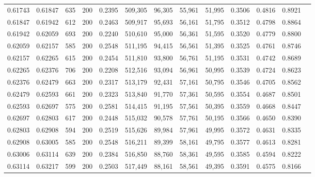 \begin{tabular}{rrrrrrrrrrrrr}
0.61743 & 0.61847 &    635 & 200 &                                     0.2395 & 509,305 &  96,305 &  55,961 &  51,995 & 0.3506 & 0.4816 & 0.8921 \\
0.61847 & 0.61942 &    612 & 200 &                                     0.2463 & 509,917 &  95,693 &  56,161 &  51,795 & 0.3512 & 0.4798 & 0.8864 \\
0.61942 & 0.62059 &    693 & 200 &                                     0.2240 & 510,610 &  95,000 &  56,361 &  51,595 & 0.3520 & 0.4779 & 0.8800 \\
0.62059 & 0.62157 &    585 & 200 &                                     0.2548 & 511,195 &  94,415 &  56,561 &  51,395 & 0.3525 & 0.4761 & 0.8746 \\
0.62157 & 0.62265 &    615 & 200 &                                     0.2454 & 511,810 &  93,800 &  56,761 &  51,195 & 0.3531 & 0.4742 & 0.8689 \\
0.62265 & 0.62376 &    706 & 200 &                                     0.2208 & 512,516 &  93,094 &  56,961 &  50,995 & 0.3539 & 0.4724 & 0.8623 \\
0.62376 & 0.62479 &    663 & 200 &                                     0.2317 & 513,179 &  92,431 &  57,161 &  50,795 & 0.3546 & 0.4705 & 0.8562 \\
0.62479 & 0.62593 &    661 & 200 &                                     0.2323 & 513,840 &  91,770 &  57,361 &  50,595 & 0.3554 & 0.4687 & 0.8501 \\
0.62593 & 0.62697 &    575 & 200 &                                     0.2581 & 514,415 &  91,195 &  57,561 &  50,395 & 0.3559 & 0.4668 & 0.8447 \\
0.62697 & 0.62803 &    617 & 200 &                                     0.2448 & 515,032 &  90,578 &  57,761 &  50,195 & 0.3566 & 0.4650 & 0.8390 \\
0.62803 & 0.62908 &    594 & 200 &                                     0.2519 & 515,626 &  89,984 &  57,961 &  49,995 & 0.3572 & 0.4631 & 0.8335 \\
0.62908 & 0.63005 &    585 & 200 &                                     0.2548 & 516,211 &  89,399 &  58,161 &  49,795 & 0.3577 & 0.4613 & 0.8281 \\
0.63006 & 0.63114 &    639 & 200 &                                     0.2384 & 516,850 &  88,760 &  58,361 &  49,595 & 0.3585 & 0.4594 & 0.8222 \\
0.63114 & 0.63217 &    599 & 200 &                                     0.2503 & 517,449 &  88,161 &  58,561 &  49,395 & 0.3591 & 0.4575 & 0.8166 \\

\end{tabular}
